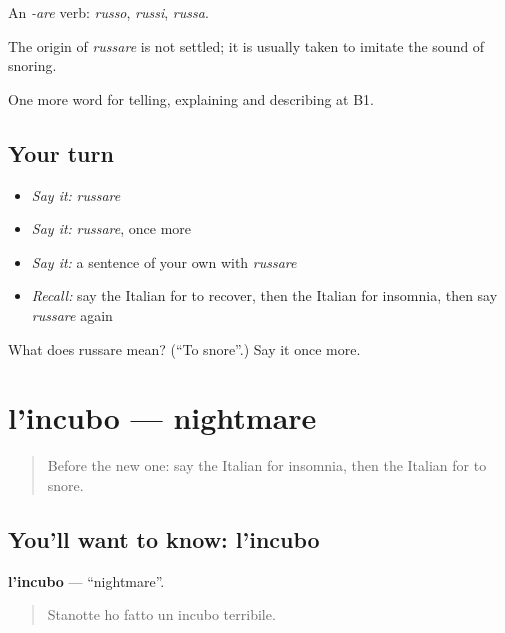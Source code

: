 An \emph{-are} verb: \emph{russo}, \emph{russi}, \emph{russa}.

\begin{cousinweb}
The origin of \emph{russare} is not settled; it is usually taken to imitate the sound of snoring.
\end{cousinweb}

\begin{grammarlens}[title={What you've built}]
One more word for telling, explaining and describing at B1.
\end{grammarlens}

\subsection*{Your turn}
\begin{itemize}
\raggedright
  \item \emph{Say it:} \emph{russare}
  \item \emph{Say it:} \emph{russare}, once more
  \item \emph{Say it:} a sentence of your own with \emph{russare}
  \item \emph{Recall:} say the Italian for to recover, then the Italian for insomnia, then say \emph{russare} again
\end{itemize}

\begin{tcolorbox}[breakable,colback=teal!4,colframe=teal!35!black,title={Before you move on}]
What does russare mean? (\textquotedblleft{}To snore\textquotedblright{}.) Say it once more.
\end{tcolorbox}
\section[l'incubo]{l'incubo — nightmare}

\label{lesson:IT-C490-incubo}



\begin{quote}
Before the new one: say the Italian for insomnia, then the Italian for to snore.
\end{quote}

\subsection*{You'll want to know: l'incubo}
\textbf{l'incubo} — \textquotedblleft{}nightmare\textquotedblright{}.

\begin{quote}
Stanotte ho fatto un incubo terribile.
\end{quote}

